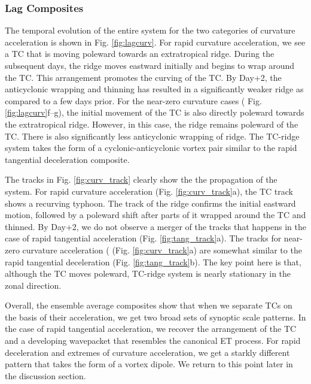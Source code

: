 \documentclass[wcd,manuscript]{copernicus}
\begin{document}
\subsubsection{Lag Composites}
The temporal evolution of the entire system for the two categories of curvature acceleration is shown in Fig. \ref{fig:lagcurv}. For rapid curvature acceleration, we see a TC that is moving poleward towards an extratropical ridge. During the subsequent days, the ridge moves eastward initially and begins to wrap around the TC. This arrangement promotes the curving of the TC. By Day+2, the anticyclonic wrapping and thinning has resulted in a significantly weaker ridge as compared to a few days prior. For the near-zero curvature cases ( Fig. \ref{fig:lagcurv}f--g), the initial movement of the TC is also directly poleward towards the extratropical ridge. However, in this case, the ridge remains poleward of the TC. There is also significantly less anticyclonic wrapping of ridge. The TC-ridge system takes the form of a cyclonic-anticyclonic vortex pair similar to the rapid tangential deceleration composite. 

The tracks in Fig. \ref{fig:curv_track} clearly show the the propagation of the system. For rapid curvature acceleration (Fig. \ref{fig:curv_track}a), the TC track shows a recurving typhoon. The track of the ridge confirms the initial eastward motion, followed by a poleward shift after parts of it wrapped around the TC and thinned. By Day+2, we do not observe a merger of the tracks that happens in the case of rapid tangential acceleration (Fig. \ref{fig:tang_track}a). The tracks for near-zero curvature acceleration ( (Fig. \ref{fig:curv_track}a) are somewhat similar to the rapid tangential deceleration (Fig. \ref{fig:tang_track}b). The key point here is that, although the TC moves poleward, TC-ridge system is nearly stationary in the zonal direction. 


Overall, the ensemble average composites show that when we separate TCs on the basis of their acceleration, we get two broad sets of synoptic scale patterns. In the case of rapid tangential acceleration, we recover the arrangement of the TC and a developing wavepacket that resembles the canonical ET process. For rapid deceleration and extremes of curvature acceleration, we get a starkly different pattern that takes the form of a vortex dipole. We return to this point later in the discussion section.

\end{document}
